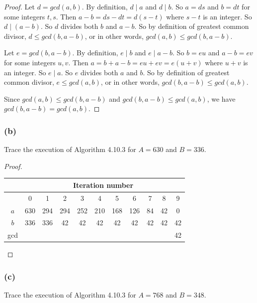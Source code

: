 \documentclass[14pt]{extarticle}
\newcommand{\cy}{\color{cyan}}
\begin{document}
\begin{proof}
Let $d = gcd(a,b)$. By definition, $d \mid a$ and $d \mid b$. So $a = ds$ and $b = dt$ for some integers $t,s$. Then $a-b = ds - dt = d(s-t)$ where $s-t$ is an integer. So $d \mid (a-b)$. So $d$ divides both $b$ and $a-b$. So by definition of greatest common divisor, $d \leq gcd(b, a-b)$, or in other words, $gcd(a,b) \leq gcd(b, a-b)$.

Let $e = gcd(b,a-b)$. By definition, $e \mid b$ and $e \mid a-b$. So $b = eu$ and $a-b = ev$ for some integers $u,v$. Then $a = b + a-b = eu + ev = e(u+v)$ where $u+v$ is an integer. So $e \mid a$. So $e$ divides both $a$ and $b$. So by definition of greatest common divisor, $e \leq gcd(a,b)$, or in other words, $gcd(b, a-b) \leq gcd(a,b)$.

Since $gcd(a,b) \leq gcd(b, a-b)$ and $gcd(b, a-b) \leq gcd(a,b)$, we have $gcd(b, a-b) = gcd(a,b)$.
\end{proof}

\subsubsection{(b)}
Trace the execution of Algorithm 4.10.3 for $A = 630$ and $B = 336$.

\begin{proof}
\begin{center}
\begin{tabular}{|c|c|c|c|c|c|c|c|c|c|c|}
\hline
    & \multicolumn{10}{c|}{{\bf \cy Iteration number}} \\
\hline
    & 0 & 1 & 2 & 3 & 4 & 5 & 6 & 7 & 8 & 9 \\
\hline
$a$ &630&294&294&252&210&168&126& 84& 42& 0 \\
\hline
$b$ &336&336& 42& 42& 42& 42& 42& 42& 42& 42\\
\hline
gcd &   &   &   &   &   &   &   &   &   & 42\\
\hline
\end{tabular}
\end{center}
\end{proof}

\subsubsection{(c)}
Trace the execution of Algorithm 4.10.3 for $A = 768$ and $B = 348$.
\end{document}
